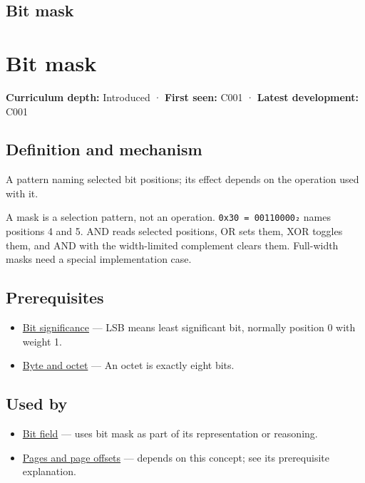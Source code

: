 \hypertarget{appendix-dbe5905163c2}{}
\section*{Bit mask}
\chapter{Bit mask}\label{appendix-dbe5905163c2-bit-mask}

\textbf{Curriculum depth:} Introduced · \textbf{First seen:} C001 · \textbf{Latest development:} C001

\section{Definition and mechanism}\label{appendix-dbe5905163c2-definition-and-mechanism}

A pattern naming selected bit positions; its effect depends on the operation used with it.

A mask is a selection pattern, not an operation. \texttt{0x30\ =\ 00110000₂} names positions 4 and 5. AND reads selected positions, OR sets them, XOR toggles them, and AND with the width-limited complement clears them. Full-width masks need a special implementation case.

\section{Prerequisites}\label{appendix-dbe5905163c2-prerequisites}

\begin{itemize}
\tightlist
\item
  \hyperref[appendix-280445746493]{Bit significance} --- LSB means least significant bit, normally position 0 with weight 1.
\item
  \hyperref[appendix-5bee2df85484]{Byte and octet} --- An octet is exactly eight bits.
\end{itemize}

\section{Used by}\label{appendix-dbe5905163c2-used-by}

\begin{itemize}
\item
  \hyperref[appendix-ac697f5c66e8]{Bit field} --- uses bit mask as part of its representation or reasoning.
\item
  \hyperref[appendix-0c67cd5bf30a]{Pages and page offsets} --- depends on this concept; see its prerequisite explanation.
\end{itemize}


